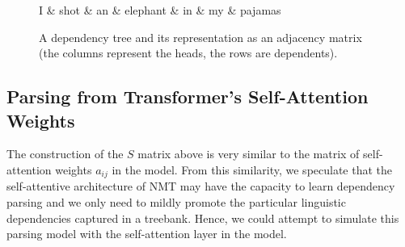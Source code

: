 \begin{figure}[t]
    \begin{minipage}[b]{0.50\linewidth}
        \centering
        \begin{dependency}
            \begin{deptext}
            I \& shot \& an \& elephant \& in \& my \& pajamas \\
            \end{deptext}
        \end{dependency}
    \end{minipage}%
    \begin{minipage}[b]{0.50\linewidth}
        \centering
    \end{minipage}
    \caption{A dependency tree and its representation as an adjacency matrix (the columns represent the heads, the rows are dependents).}
    \label{fig:deptree-vs-matrix}
\end{figure}

\subsection{Parsing from Transformer's Self-Attention Weights}
\label{multitask-dep-parsing}

The construction of the $S$ matrix above is very similar to the matrix of self-attention weights $a_{ij}$ in the \transformer model.
From this similarity, we speculate that the self-attentive architecture of \transformer NMT may have the capacity to learn dependency parsing and we only need to mildly promote the particular linguistic dependencies captured in a treebank. Hence, we could attempt to simulate this parsing model with the self-attention layer in the \transformer model.

